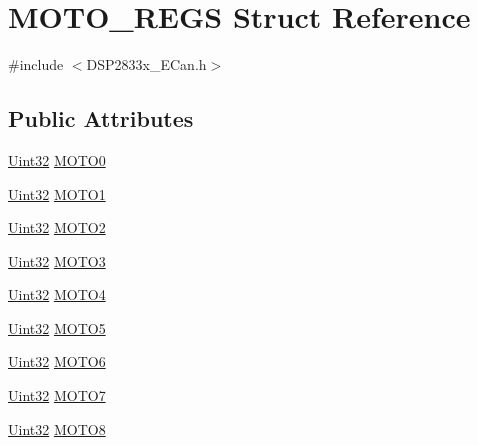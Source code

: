 \hypertarget{struct_m_o_t_o___r_e_g_s}{}\section{M\+O\+T\+O\+\_\+\+R\+E\+G\+S Struct Reference}
\label{struct_m_o_t_o___r_e_g_s}


{\ttfamily \#include $<$D\+S\+P2833x\+\_\+\+E\+Can.\+h$>$}

\subsection*{Public Attributes}
\begin{DoxyCompactItemize}
\item 
\hyperlink{_d_s_p2833x___device_8h_aba99025e657f892beb7ff31cecf64653}{Uint32} \hyperlink{struct_m_o_t_o___r_e_g_s_a171855cab3ef5f6f1f6d9ca57ab0349a}{M\+O\+T\+O0}
\item 
\hyperlink{_d_s_p2833x___device_8h_aba99025e657f892beb7ff31cecf64653}{Uint32} \hyperlink{struct_m_o_t_o___r_e_g_s_aa86cfa8acdce7e0b007f5a444205fba5}{M\+O\+T\+O1}
\item 
\hyperlink{_d_s_p2833x___device_8h_aba99025e657f892beb7ff31cecf64653}{Uint32} \hyperlink{struct_m_o_t_o___r_e_g_s_aed06771ee53f4fe1f47f710fcf2a1644}{M\+O\+T\+O2}
\item 
\hyperlink{_d_s_p2833x___device_8h_aba99025e657f892beb7ff31cecf64653}{Uint32} \hyperlink{struct_m_o_t_o___r_e_g_s_ab672466b304636802da72e26f1a592fe}{M\+O\+T\+O3}
\item 
\hyperlink{_d_s_p2833x___device_8h_aba99025e657f892beb7ff31cecf64653}{Uint32} \hyperlink{struct_m_o_t_o___r_e_g_s_a55fe7fe4e5497ef444e975eba51f1049}{M\+O\+T\+O4}
\item 
\hyperlink{_d_s_p2833x___device_8h_aba99025e657f892beb7ff31cecf64653}{Uint32} \hyperlink{struct_m_o_t_o___r_e_g_s_ac8aa465c09fbb7aa5c281ce632548c6d}{M\+O\+T\+O5}
\item 
\hyperlink{_d_s_p2833x___device_8h_aba99025e657f892beb7ff31cecf64653}{Uint32} \hyperlink{struct_m_o_t_o___r_e_g_s_aafdd8a93014ad9a43bbcebbcb6bec9b7}{M\+O\+T\+O6}
\item 
\hyperlink{_d_s_p2833x___device_8h_aba99025e657f892beb7ff31cecf64653}{Uint32} \hyperlink{struct_m_o_t_o___r_e_g_s_ab78f7a9bf32148cd69cccab2c49e9700}{M\+O\+T\+O7}
\item 
\hyperlink{_d_s_p2833x___device_8h_aba99025e657f892beb7ff31cecf64653}{Uint32} \hyperlink{struct_m_o_t_o___r_e_g_s_a35540dac20b32a125bebf7089560709a}{M\+O\+T\+O8}

\end{DoxyCompactItemize}
